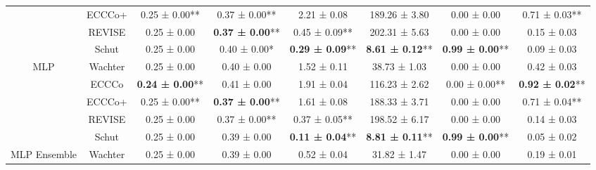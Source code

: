 \begin{table}
{\begin{tabular}[t]{cccccccc}
 & ECCCo+ & 0.25 ± 0.00** & 0.37 ± 0.00** & 2.21 ± 0.08\hphantom{*}\hphantom{*} & 189.26 ± 3.80\hphantom{*}\hphantom{*} & 0.00 ± 0.00\hphantom{*}\hphantom{*} & 0.71 ± 0.03**\\

 & REVISE & 0.25 ± 0.00\hphantom{*}\hphantom{*} & \textbf{0.37 ± 0.00}** & 0.45 ± 0.09** & 202.31 ± 5.63\hphantom{*}\hphantom{*} & 0.00 ± 0.00\hphantom{*}\hphantom{*} & 0.15 ± 0.03\hphantom{*}\hphantom{*}\\

 & Schut & 0.25 ± 0.00\hphantom{*}\hphantom{*} & 0.40 ± 0.00*\hphantom{*} & \textbf{0.29 ± 0.09}** & \textbf{8.61 ± 0.12}** & \textbf{0.99 ± 0.00}** & 0.09 ± 0.03\hphantom{*}\hphantom{*}\\

\multirow[t]{-5}{*}{\centering\arraybackslash MLP} & Wachter & 0.25 ± 0.00\hphantom{*}\hphantom{*} & 0.40 ± 0.00\hphantom{*}\hphantom{*} & 1.52 ± 0.11\hphantom{*}\hphantom{*} & 38.73 ± 1.03\hphantom{*}\hphantom{*} & 0.00 ± 0.00\hphantom{*}\hphantom{*} & 0.42 ± 0.03\hphantom{*}\hphantom{*}\\
\cmidrule{1-8}
 & ECCCo & \textbf{0.24 ± 0.00}** & 0.41 ± 0.00\hphantom{*}\hphantom{*} & 1.91 ± 0.04\hphantom{*}\hphantom{*} & 116.23 ± 2.62\hphantom{*}\hphantom{*} & 0.00 ± 0.00** & \textbf{0.92 ± 0.02}**\\

 & ECCCo+ & 0.25 ± 0.00** & \textbf{0.37 ± 0.00}** & 1.61 ± 0.08\hphantom{*}\hphantom{*} & 188.33 ± 3.71\hphantom{*}\hphantom{*} & 0.00 ± 0.00\hphantom{*}\hphantom{*} & 0.71 ± 0.04**\\

 & REVISE & 0.25 ± 0.00\hphantom{*}\hphantom{*} & 0.37 ± 0.00** & 0.37 ± 0.05** & 198.52 ± 6.17\hphantom{*}\hphantom{*} & 0.00 ± 0.00\hphantom{*}\hphantom{*} & 0.14 ± 0.03\hphantom{*}\hphantom{*}\\

 & Schut & 0.25 ± 0.00\hphantom{*}\hphantom{*} & 0.39 ± 0.00\hphantom{*}\hphantom{*} & \textbf{0.11 ± 0.04}** & \textbf{8.81 ± 0.11}** & \textbf{0.99 ± 0.00}** & 0.05 ± 0.02\hphantom{*}\hphantom{*}\\

\multirow[t]{-5}{*}{\centering\arraybackslash MLP Ensemble} & Wachter & 0.25 ± 0.00\hphantom{*}\hphantom{*} & 0.39 ± 0.00\hphantom{*}\hphantom{*} & 0.52 ± 0.04\hphantom{*}\hphantom{*} & 31.82 ± 1.47\hphantom{*}\hphantom{*} & 0.00 ± 0.00\hphantom{*}\hphantom{*} & 0.19 ± 0.01\hphantom{*}\hphantom{*}\\
\bottomrule
\end{tabular}}
\end{table}
